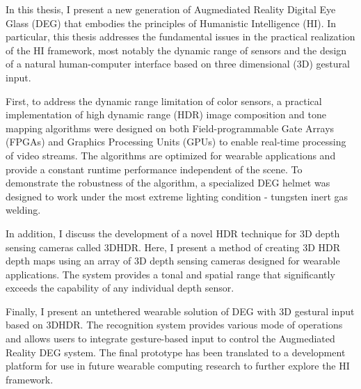 In this thesis, I present a new generation of Augmediated Reality Digital Eye Glass (DEG) that embodies the principles of Humanistic Intelligence (HI).  In particular, this thesis addresses the fundamental issues in the practical realization of the HI framework, most notably the dynamic range of sensors and the design of a natural human-computer interface based on three dimensional (3D) gestural input.  

First, to address the dynamic range limitation of color sensors, a practical implementation of high dynamic range (HDR) image composition and tone mapping algorithms were designed on both Field-programmable Gate Arrays (FPGAs) and Graphics Processing Units (GPUs) to enable real-time processing of video streams. The algorithms are optimized for wearable applications and provide a constant runtime performance independent of the scene. To demonstrate the robustness of the algorithm, a specialized DEG helmet was designed to work under the most extreme lighting condition - tungsten inert gas welding. 

In addition, I discuss the development of a novel HDR technique for 3D depth sensing cameras called 3DHDR.  Here, I present a method of creating 3D HDR depth maps using an array of 3D depth sensing cameras designed for wearable applications. The system provides a tonal and spatial range that significantly exceeds the capability of any individual depth sensor. 
 
Finally, I present an untethered wearable solution of DEG with 3D gestural input based on 3DHDR. The recognition system provides various mode of operations and allows users to integrate gesture-based input to control the Augmediated Reality DEG system. The final prototype has been translated to a development platform for use in future wearable computing research to further explore the HI framework. 